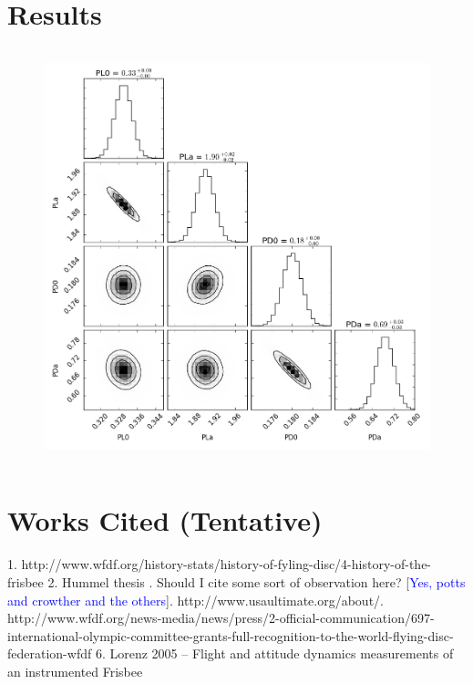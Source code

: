 \documentclass[a4paper,12pt, oneside]{article}
\newcommand{\blue}[1]{\textcolor{blue}{#1}}
\begin{document}
\section{Results}
\begin{figure}[H]
        \includegraphics[width=12cm, height=12cm]{LiftDragCP}
	\centering
	\caption{}
\end{figure}

\section{Works Cited (Tentative)}

1. http://www.wfdf.org/history-stats/history-of-fyling-disc/4-history-of-the-frisbee
2. Hummel thesis . Should I cite some sort of observation here? [\blue{Yes, potts and crowther and the others}]. http://www.usaultimate.org/about/. http://www.wfdf.org/news-media/news/press/2-official-communication/697-international-olympic-committee-grants-full-recognition-to-the-world-flying-disc-federation-wfdf
6. Lorenz 2005 -- Flight and attitude dynamics measurements of an instrumented Frisbee 
\end{document}
